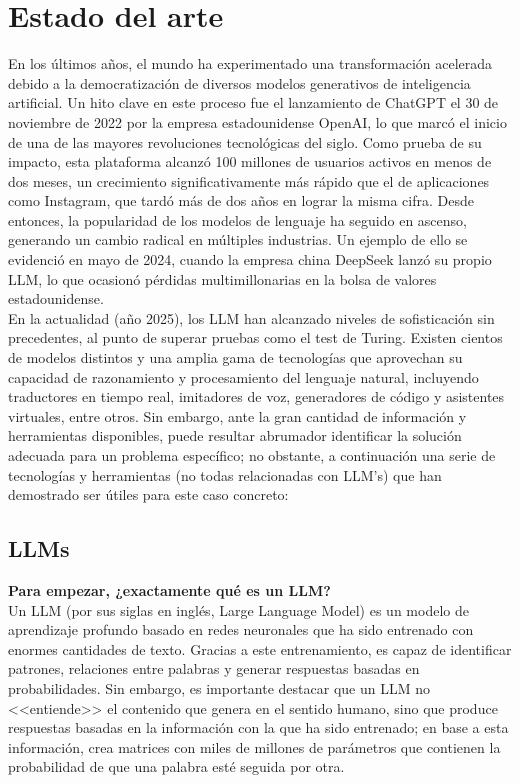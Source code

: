 \documentclass{article}
\begin{document}
\section{Estado del arte}
En los últimos años, el mundo ha experimentado una transformación acelerada debido a la democratización de diversos modelos generativos de inteligencia artificial. Un hito clave en este proceso fue el lanzamiento de ChatGPT el 30 de noviembre de 2022 por la empresa estadounidense OpenAI, lo que marcó el inicio de una de las mayores revoluciones tecnológicas del siglo. Como prueba de su impacto, esta plataforma alcanzó 100 millones de usuarios activos en menos de dos meses, un crecimiento significativamente más rápido que el de aplicaciones como Instagram, que tardó más de dos años en lograr la misma cifra. Desde entonces, la popularidad de los modelos de lenguaje ha seguido en ascenso, generando un cambio radical en múltiples industrias. Un ejemplo de ello se evidenció en mayo de 2024, cuando la empresa china DeepSeek lanzó su propio LLM, lo que ocasionó pérdidas multimillonarias en la bolsa de valores estadounidense. \\
En la actualidad (año 2025), los LLM han alcanzado niveles de sofisticación sin precedentes, al punto de superar pruebas como el test de Turing. Existen cientos de modelos distintos y una amplia gama de tecnologías que aprovechan su capacidad de razonamiento y procesamiento del lenguaje natural, incluyendo traductores en tiempo real, imitadores de voz, generadores de código y asistentes virtuales, entre otros. Sin embargo, ante la gran cantidad de información y herramientas disponibles, puede resultar abrumador identificar la solución adecuada para un problema específico; no obstante, a continuación una serie de tecnologías y herramientas (no todas relacionadas con LLM's) que han demostrado ser útiles para este caso concreto:

\subsection{LLMs}
\textbf{Para empezar, ¿exactamente qué es un LLM?} \\
Un LLM (por sus siglas en inglés, Large Language Model) es un modelo de aprendizaje profundo basado en redes neuronales que ha sido entrenado con enormes cantidades de texto. Gracias a este entrenamiento, es capaz de identificar patrones, relaciones entre palabras y generar respuestas basadas en probabilidades. Sin embargo, es importante destacar que un LLM no <<entiende>> el contenido que genera en el sentido humano, sino que produce respuestas basadas en la información con la que ha sido entrenado; en base a esta información, crea matrices con miles de millones de parámetros que contienen la probabilidad de que una palabra esté seguida por otra. \\
\end{document}
